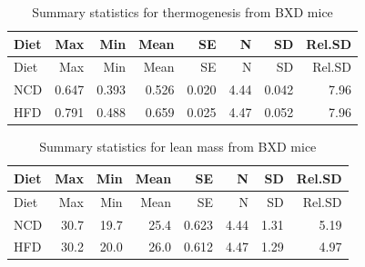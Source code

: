 \documentclass[]{article}
\newenvironment{Shaded}{\begin{snugshade}}{\end{snugshade}}
\newcommand{\DataTypeTok}[1]{\textcolor[rgb]{0.13,0.29,0.53}{#1}}
\newcommand{\DecValTok}[1]{\textcolor[rgb]{0.00,0.00,0.81}{#1}}
\newcommand{\KeywordTok}[1]{\textcolor[rgb]{0.13,0.29,0.53}{\textbf{#1}}}
\newcommand{\NormalTok}[1]{#1}
\newcommand{\OperatorTok}[1]{\textcolor[rgb]{0.81,0.36,0.00}{\textbf{#1}}}
\newcommand{\StringTok}[1]{\textcolor[rgb]{0.31,0.60,0.02}{#1}}
\begin{document}
\begin{longtable}[]{@{}lrrrrrrr@{}}
\caption{Summary statistics for thermogenesis from BXD
mice}\tabularnewline
\toprule
Diet & Max & Min & Mean & SE & N & SD & Rel.SD\tabularnewline
\midrule
\endfirsthead
\toprule
Diet & Max & Min & Mean & SE & N & SD & Rel.SD\tabularnewline
\midrule
\endhead
NCD & 0.647 & 0.393 & 0.526 & 0.020 & 4.44 & 0.042 & 7.96\tabularnewline
HFD & 0.791 & 0.488 & 0.659 & 0.025 & 4.47 & 0.052 & 7.96\tabularnewline
\bottomrule
\end{longtable}

\begin{Shaded}
\end{Shaded}

\begin{longtable}[]{@{}lrrrrrrr@{}}
\caption{Summary statistics for lean mass from BXD mice}\tabularnewline
\toprule
Diet & Max & Min & Mean & SE & N & SD & Rel.SD\tabularnewline
\midrule
\endfirsthead
\toprule
Diet & Max & Min & Mean & SE & N & SD & Rel.SD\tabularnewline
\midrule
\endhead
NCD & 30.7 & 19.7 & 25.4 & 0.623 & 4.44 & 1.31 & 5.19\tabularnewline
HFD & 30.2 & 20.0 & 26.0 & 0.612 & 4.47 & 1.29 & 4.97\tabularnewline
\bottomrule
\end{longtable}
\end{document}
